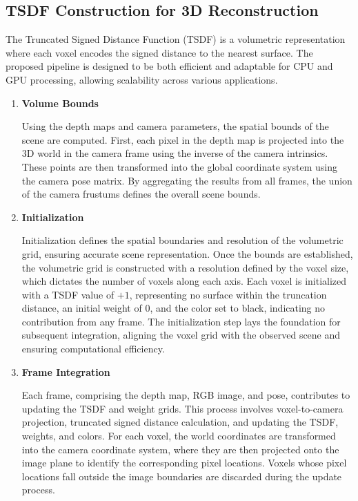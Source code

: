 \documentclass[conference]{IEEEtran}
\begin{document}
\subsection{TSDF Construction for 3D Reconstruction}

The Truncated Signed Distance Function (TSDF) is a volumetric representation where each voxel encodes the signed distance to the nearest surface. The proposed pipeline is designed to be both efficient and adaptable for CPU and GPU processing, allowing scalability across various applications.

\begin{enumerate}
    \item \textbf{Volume Bounds} \par
    Using the depth maps and camera parameters, the spatial bounds of the scene are computed. First, each pixel in the depth map is projected into the 3D world in the camera frame using the inverse of the camera intrinsics. These points are then transformed into the global coordinate system using the camera pose matrix. By aggregating the results from all frames, the union of the camera frustums defines the overall scene bounds.
    
    \item \textbf{Initialization} \par
    Initialization defines the spatial boundaries and resolution of the volumetric grid, ensuring accurate scene representation. Once the bounds are established, the volumetric grid is constructed with a resolution defined by the voxel size, which dictates the number of voxels along each axis. Each voxel is initialized with a TSDF value of $+1$, representing no surface within the truncation distance, an initial weight of $0$, and the color set to black, indicating no contribution from any frame. The initialization step lays the foundation for subsequent integration, aligning the voxel grid with the observed scene and ensuring computational efficiency.
    
    \item \textbf{Frame Integration} \par
    Each frame, comprising the depth map, RGB image, and pose, contributes to updating the TSDF and weight grids. This process involves voxel-to-camera projection, truncated signed distance calculation, and updating the TSDF, weights, and colors. 
    For each voxel, the world coordinates are transformed into the camera coordinate system, where they are then projected onto the image plane to identify the corresponding pixel locations. Voxels whose pixel locations fall outside the image boundaries are discarded during the update process.
    

\end{enumerate}
\end{document}
